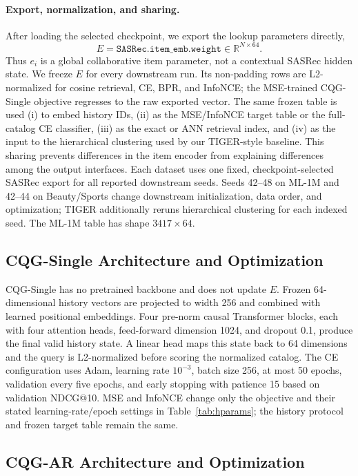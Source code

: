 \documentclass[letterpaper]{article}
\begin{document}
\paragraph{Export, normalization, and sharing.}
After loading the selected checkpoint, we export the lookup parameters
directly,
\[
  E=\texttt{SASRec.item\_emb.weight}\in\mathbb{R}^{N\times64}.
\]
Thus \(e_i\) is a global collaborative item parameter, not a contextual
SASRec hidden state.  We freeze \(E\) for every downstream run.  Its
non-padding rows are L2-normalized for cosine retrieval, CE, BPR, and
InfoNCE; the MSE-trained CQG-Single objective regresses to the raw exported
vector.  The same frozen table is used (i) to embed history IDs,
(ii) as the MSE/InfoNCE target table or the full-catalog CE classifier,
(iii) as the exact or ANN retrieval index, and (iv) as the input to the
hierarchical clustering used by our TIGER-style baseline. This sharing
prevents differences in the item encoder from explaining differences among
the output interfaces. Each dataset uses one fixed, checkpoint-selected
SASRec export for all reported downstream seeds. Seeds 42--48 on ML-1M and
42--44 on Beauty/Sports change downstream initialization, data order, and
optimization; TIGER additionally reruns hierarchical clustering for each
indexed seed. The ML-1M table has shape \(3417\times64\).

\subsection{CQG-Single Architecture and Optimization}
\label{app:cqg-single-training}

CQG-Single has no pretrained backbone and does not update \(E\).  Frozen
64-dimensional history vectors are projected to width 256 and combined with
learned positional embeddings.  Four pre-norm causal Transformer blocks,
each with four attention heads, feed-forward dimension 1024, and dropout 0.1,
produce the final valid history state.  A linear head maps this state back to
64 dimensions and the query is L2-normalized before scoring the normalized
catalog.  The CE configuration uses Adam, learning rate \(10^{-3}\), batch
size 256, at most 50 epochs, validation every five epochs, and early stopping
with patience 15 based on validation NDCG@10.  MSE and InfoNCE change only
the objective and their stated learning-rate/epoch settings in
Table~\ref{tab:hparams}; the history protocol and frozen target table remain
the same.

\subsection{CQG-AR Architecture and Optimization}
\label{app:cqg-ar-training}
\end{document}
